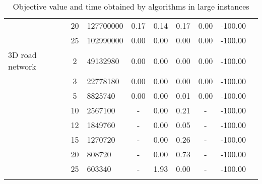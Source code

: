 {\begin{longtable}{@{}lclcccccc@{}}
                  & 20 & 127700000        & 0.17    & 0.14    & 0.17   & 0.00 & -100.00 &           \\
                  & 25 & 102990000        & 0.00    & 0.00    & 0.00   & 0.00 & -100.00 &           \\ \hline
3D road network   & 2  & 49132980         & 0.00    & 0.00    & 0.00   & 0.00 & -100.00 &           \\
                  & 3  & 22778180         & 0.00    & 0.00    & 0.00   & 0.00 & -100.00 &           \\
                  & 5  & 8825740          & 0.00    & 0.00    & 0.01   & 0.00 & -100.00 &           \\
                  & 10 & 2567100          & -       & 0.00    & 0.21   & -    & -100.00 &           \\
                  & 12 & 1849760          & -       & 0.00    & 0.05   & -    & -100.00 &           \\
                  & 15 & 1270720          & -       & 0.00    & 0.26   & -    & -100.00 &           \\
                  & 20 & 808720           & -       & 0.00    & 0.73   & -    & -100.00 &           \\
                  & 25 & 603340           & -       & 1.93    & 0.00   & -    & -100.00 &         
\\ \bottomrule
\caption{Objective value and time obtained by algorithms in large instances}
\label{results-all-C}
\end{longtable}}